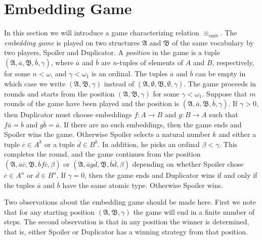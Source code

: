 \documentclass{ndjflart}
\theoremstyle{plain}
\theoremstyle{definition}
\numberwithin{equation}{section}
\DeclareMathOperator{\emb}{emb}
\begin{document}
\section{Embedding Game}\label{game_section}

In this section we will introduce a game characterizing relation $\equiv_{\emb}$.
The \emph{embedding game} is played on two structures $\mathfrak{A}$ and
$\mathfrak{B}$ of the same vocabulary by two players, Spoiler and Duplicator.
A \emph{position} in the game is a tuple
$(\mathfrak{A},\overline{a},\mathfrak{B},\overline{b},\gamma)$, where
$\overline{a}$ and $\overline{b}$ are $n$-tuples of elements of $A$ and $B$,
respectively, for some $n < \omega$, and $\gamma<\omega_1$ is an ordinal.
The tuples $\overline{a}$ and $\overline{b}$ can be empty in which case we write
$(\mathfrak{A},\mathfrak{B},\gamma)$ instead of
$(\mathfrak{A},\emptyset,\mathfrak{B},\emptyset,\gamma)$.
The game proceeds in rounds and starts from the position
$(\mathfrak{A},\mathfrak{B},\gamma)$ for some $\gamma < \omega_1$.
Suppose that $m$ rounds of the game have been played and the position is
$(\mathfrak{A},\overline{a},\mathfrak{B},\overline{b},\gamma)$.
If $\gamma > 0$, then Duplicator must choose embeddings
$f \colon A \rightarrow B$ and $g \colon B \rightarrow A$ such that
$f\overline{a} = \overline{b}$ and $g\overline{b} = \overline{a}$.
If there are no such embeddings, then the game ends and Spoiler wins the game.
Otherwise Spoiler selects a natural number $k$ and either a tuple
$\overline{c} \in A^k$ or a tuple $\overline{d} \in B^k$.
In addition, he picks an ordinal $\beta<\gamma$.
This completes the round, and the game continues from the position
$(\mathfrak{A},\overline{a}\overline{c},\mathfrak{B},\overline{b}f\overline{c},\beta)$
or $(\mathfrak{A},\overline{a}g\overline{d},\mathfrak{B},\overline{b}\overline{d},\beta)$
depending on whether Spoiler chose $\overline{c} \in A^n$ or $\overline{d} \in B^n$.
If $\gamma = 0$, then the game ends and Duplicator wins if and only if the tuples
$\overline{a}$ and $\overline{b}$ have the same atomic type. Otherwise Spoiler wins.

Two observations about the embedding game should be made here.
First we note that for any starting position $(\mathfrak{A},\mathfrak{B},\gamma)$
the game will end in a finite number of steps. The second observation is that
in any position the winner is determined, that is,
either Spoiler or Duplicator has a winning strategy from that position.
\end{document}
